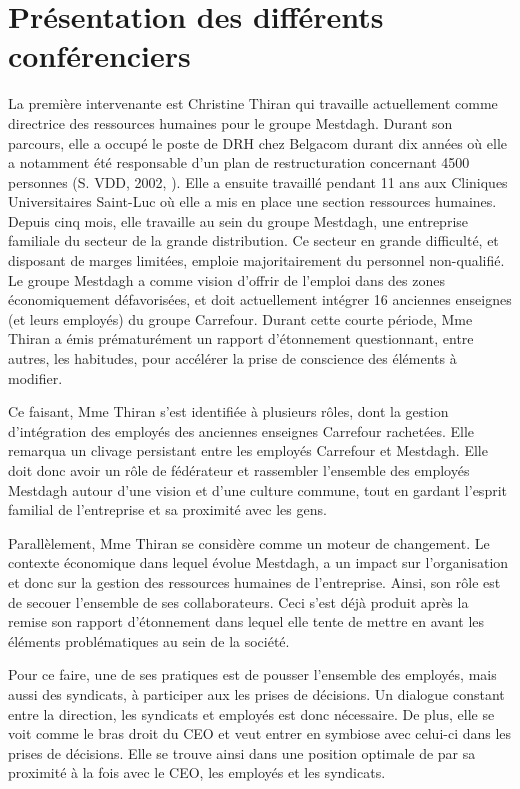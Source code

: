 \section{Présentation des différents conférenciers}
La première intervenante est Christine Thiran qui travaille actuellement comme directrice des ressources humaines pour le groupe Mestdagh. Durant son parcours, elle a occupé le poste de DRH chez Belgacom durant dix années où elle a notamment été responsable d'un plan de restructuration concernant 4500 personnes (S. VDD, 2002, \cite{planBEST}).
Elle a ensuite travaillé pendant 11 ans aux Cliniques Universitaires Saint-Luc où elle a mis en place une section ressources humaines.
Depuis cinq mois, elle travaille au sein du groupe Mestdagh, une entreprise familiale du secteur de la grande distribution. Ce secteur en grande difficulté, et disposant de marges limitées, emploie majoritairement du personnel non-qualifié. Le groupe Mestdagh a comme vision d'offrir de l'emploi dans des zones économiquement défavorisées, et doit actuellement intégrer 16 anciennes enseignes (et leurs employés) du groupe Carrefour.
Durant cette courte période, Mme Thiran a émis prématurément un rapport d'étonnement questionnant, entre autres, les habitudes, pour accélérer la prise de conscience des éléments à modifier. \newline

Ce faisant, Mme Thiran s'est identifiée à plusieurs rôles, dont la gestion d'intégration des employés des anciennes enseignes Carrefour rachetées. Elle remarqua un clivage persistant entre les employés Carrefour et Mestdagh. Elle doit donc avoir un rôle de fédérateur et rassembler l'ensemble des employés Mestdagh autour d'une vision et d'une culture commune, tout en gardant l'esprit familial de l'entreprise et sa proximité avec les gens.\newline

Parallèlement, Mme Thiran se considère comme un moteur de changement. Le contexte économique dans lequel évolue Mestdagh, a un impact sur l'organisation et donc sur la gestion des ressources humaines de l'entreprise. Ainsi, son rôle est de \og{}secouer\fg{} l'ensemble de ses collaborateurs. Ceci s'est déjà produit après la remise son rapport d'étonnement dans lequel elle tente de mettre en avant les éléments problématiques au sein de la société.\newline

Pour ce faire, une de ses pratiques est de pousser l'ensemble des employés, mais aussi des syndicats, à participer aux les prises de décisions. Un dialogue constant entre la direction, les syndicats et employés est donc nécessaire. De plus, elle se voit comme le bras droit du CEO et veut entrer en symbiose avec celui-ci dans les prises de décisions. Elle se trouve ainsi dans une position optimale de par sa proximité à la fois avec le CEO, les employés et les syndicats.\newline

